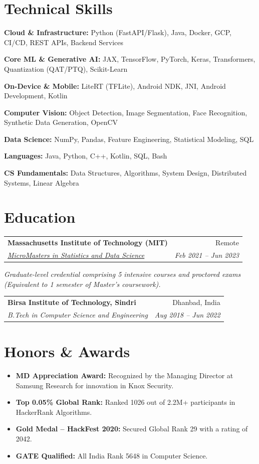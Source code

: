 \documentclass[10pt, letterpaper]{article}
\makeatletter
\newcommand{\resumeItem}[1]{
  \item\small{
    {#1 \vspace{-2pt}}
  }
}
\newcommand{\resumeSubheading}[4]{
  \vspace{-1pt}\item
    \begin{tabular*}{0.98\textwidth}[t]{l@{\extracolsep{\fill}}r}
      \textbf{#1} & {\small\color{darkgray} #2} \\
      \textit{\small#3} & \textit{\small\color{darkgray} #4} \\
    \end{tabular*}\vspace{-7pt}
}
\newcommand{\resumeSubHeadingListStart}{\begin{itemize}[leftmargin=0.15in, label={}]}
\newcommand{\resumeSubHeadingListEnd}{\end{itemize}}
\makeatother
\begin{document}
\section{Technical Skills}
 \begin{itemize}[leftmargin=0.12in, label={}]
    \small{\item{\textbf{Cloud \& Infrastructure:} Python (FastAPI/Flask), Java, Docker, GCP, CI/CD, REST APIs, Backend Services}}
    \small{\item{\textbf{Core ML \& Generative AI:} JAX, TensorFlow, PyTorch, Keras, Transformers, Quantization (QAT/PTQ), Scikit-Learn}}
    \small{\item{\textbf{On-Device \& Mobile:} LiteRT (TFLite), Android NDK, JNI, Android Development, Kotlin}}
    \small{\item{\textbf{Computer Vision:} Object Detection, Image Segmentation, Face Recognition, Synthetic Data Generation, OpenCV}}
    \small{\item{\textbf{Data Science:} NumPy, Pandas, Feature Engineering, Statistical Modeling, SQL}}
    \small{\item{\textbf{Languages:} Java, Python, C++, Kotlin, SQL, Bash}}
    \small{\item{\textbf{CS Fundamentals:} Data Structures, Algorithms, System Design, Distributed Systems, Linear Algebra}}
 \end{itemize}

\section{Education}
  \resumeSubHeadingListStart
    \resumeSubheading
      {Massachusetts Institute of Technology (MIT)}{Remote}
      {\href{https://micromasters.mit.edu/ds}{MicroMasters in Statistics and Data Science}}{Feb 2021 -- Jun 2023}
      \vspace{-4pt}
      \small{\item{\textit{Graduate-level credential comprising 5 intensive courses and proctored exams (Equivalent to 1 semester of Master's coursework).}}}
    \resumeSubheading
      {Birsa Institute of Technology, Sindri}{Dhanbad, India}
      {B.Tech in Computer Science and Engineering}{Aug 2018 -- Jun 2022}
  \resumeSubHeadingListEnd

\section{Honors \& Awards}
  \resumeSubHeadingListStart
    \resumeItem{\textbf{MD Appreciation Award:} Recognized by the Managing Director at Samsung Research for innovation in Knox Security.}
    \resumeItem{\textbf{Top 0.05\% Global Rank:} Ranked 1026 out of 2.2M+ participants in HackerRank Algorithms.}
    \resumeItem{\textbf{Gold Medal -- HackFest 2020:} Secured Global Rank 29 with a rating of 2042.}
    \resumeItem{\textbf{GATE Qualified:} All India Rank 5648 in Computer Science.}
  \resumeSubHeadingListEnd
\end{document}
